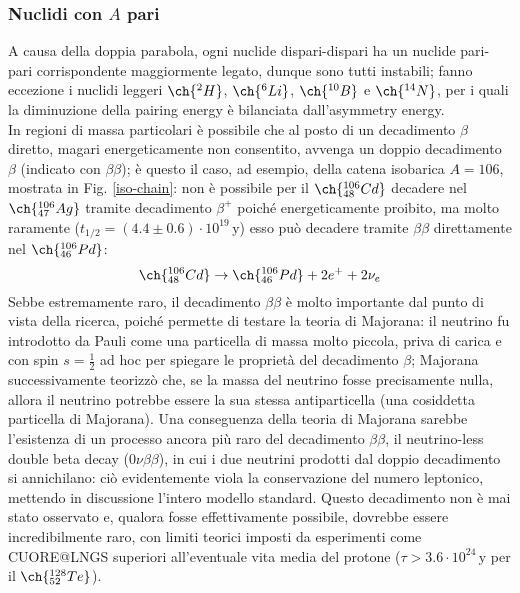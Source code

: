 \subsubsection{Nuclidi con \texorpdfstring{$ A $}{TEXT} pari}

A causa della doppia parabola, ogni nuclide dispari-dispari ha un nuclide pari-pari corrispondente maggiormente legato, dunque sono tutti instabili; fanno eccezione i nuclidi leggeri $ \ch{^2 H} $, $ \ch{^6 Li} $, $ \ch{^{10} B} $ e $ \ch{^{14} N} $, per i quali la diminuzione della pairing energy è bilanciata dall'asymmetry energy.\\
In regioni di massa particolari è possibile che al posto di un decadimento $ \beta $ diretto, magari energeticamente non consentito, avvenga un doppio decadimento $ \beta $ (indicato con $ \beta\beta $); è questo il caso, ad esempio, della catena isobarica $ A = 106 $, mostrata in Fig. \ref{iso-chain}: non è possibile per il $ \ch{^{106}_{48} Cd} $ decadere nel $ \ch{^{106}_{47} Ag} $ tramite decadimento $ \beta^+ $ poiché energeticamente proibito, ma molto raramente ($ t_{1/2} = (4.4 \pm 0.6) \cdot 10^{19} \,\text{y} $) esso può decadere tramite $ \beta\beta $ direttamente nel $ \ch{^{106}_{46} Pd} $:
\begin{equation*}
	\ch{^{106}_{48} Cd} \rightarrow \ch{^{106}_{46} Pd} + 2e^+ + 2\nu_e
\end{equation*}
Sebbe estremamente raro, il decadimento $ \beta\beta $ è molto importante dal punto di vista della ricerca, poiché permette di testare la teoria di Majorana: il neutrino fu introdotto da Pauli come una particella di massa molto piccola, priva di carica e con spin $ s = \frac{1}{2} $ ad hoc per spiegare le proprietà del decadimento $ \beta $; Majorana successivamente teorizzò che, se la massa del neutrino fosse precisamente nulla, allora il neutrino potrebbe essere la sua stessa antiparticella (una cosiddetta particella di Majorana). Una conseguenza della teoria di Majorana sarebbe l'esistenza di un processo ancora più raro del decadimento $ \beta\beta $, il neutrino-less double beta decay ($ 0\nu\beta\beta $), in cui i due neutrini prodotti dal doppio decadimento si annichilano: ciò evidentemente viola la conservazione del numero leptonico, mettendo in discussione l'intero modello standard. Questo decadimento non è mai stato osservato e, qualora fosse effettivamente possibile, dovrebbe essere incredibilmente raro, con limiti teorici imposti da esperimenti come CUORE@LNGS superiori all'eventuale vita media del protone ($ \tau > 3.6 \cdot 10^{24} \,\text{y} $ per il $ \ch{^{128}_{52} Te} $).

